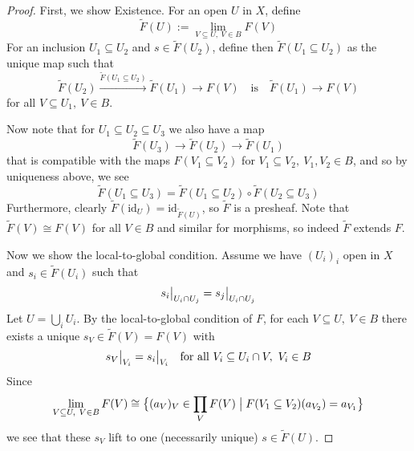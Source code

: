 \documentclass{scrartcl}
\newcommand\restr[2]{{
    \left.\kern-\nulldelimiterspace
    #1
    \vphantom{\big|}
    \right|_{#2}
}}
\theoremstyle{definition}
\begin{document}
\begin{proof}
    First, we show Existence. For an open $U$ in $X$, define
    \begin{equation*}
        \tilde{F}(U) := \lim_{V \subseteq U, \ V \in B} F(V)
    \end{equation*}
    For an inclusion $U_1 \subseteq U_2$ and $s \in \tilde{F}(U_2)$, define then $\tilde{F}(U_1 \subseteq U_2)$ as the unique map such that
    \begin{equation*}
        \tilde{F}(U_2) \overset{\tilde{F}(U_1 \subseteq U_2)}{\to} \tilde{F}(U_1) \to F(V) \quad \text{is} \quad \tilde{F}(U_1) \to F(V)
    \end{equation*}
    for all $V \subseteq U_1, \ V \in B$.
    
    Now note that for $U_1 \subseteq U_2 \subseteq U_3$ we also have a map
    \begin{equation*}
        \tilde{F}(U_3) \to \tilde{F}(U_2) \to \tilde{F}(U_1)
    \end{equation*}
    that is compatible with the maps $F(V_1 \subseteq V_2)$ for $V_1 \subseteq V_2, \ V_1, V_2 \in B$, and so by uniqueness above, we see
    \begin{equation*}
        \tilde{F}(U_1 \subseteq U_3) = \tilde{F}(U_1 \subseteq U_2) \circ \tilde{F}(U_2 \subseteq U_3)
    \end{equation*}
    Furthermore, clearly $\tilde{F}(\mathrm{id}_U) = \mathrm{id}_{\tilde{F}(U)}$, so $\tilde{F}$ is a presheaf.
    Note that $\tilde{F}(V) \cong F(V)$ for all $V \in B$ and similar for morphisms, so indeed $\tilde{F}$ extends $F$.

    Now we show the local-to-global condition.
    Assume we have $(U_i)_i$ open in $X$ and $s_i \in \tilde{F}(U_i)$ such that
    \begin{equation*}
        \restr{s_i}{U_i \cap U_j} = \restr{s_j}{U_i \cap U_j}
    \end{equation*}
    Let $U = \bigcup_i U_i$. 
    By the local-to-global condition of $F$, for each $ V \subseteq U, \ V \in B$ there exists a unique $s_V \in \tilde{F}(V) = F(V)$ with
    \begin{equation*}
        \restr{s_V}{V_i} = \restr{s_i}{V_i} \quad \text{for all $V_i \subseteq U_i \cap V, \ V_i \in B$}
    \end{equation*}
    Since
    \begin{equation*}
        \lim_{V \subseteq U, \ V \in B} F(V) \cong \bigl\{ (a_V)_V \in \prod_V F(V) \bigm| F(V_1 \subseteq V_2)(a_{V_2}) = a_{V_1} \bigr\}
    \end{equation*}
    we see that these $s_V$ lift to one (necessarily unique) $s \in \tilde{F}(U)$.


\end{proof}
\end{document}
